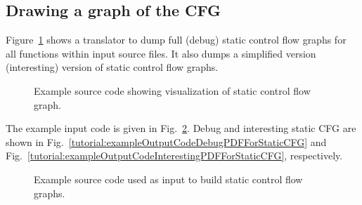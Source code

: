 \subsection{Drawing a graph of the CFG}
Figure~\ref{Tutorial:BuildStaticCFG} shows a translator to dump 
full (debug) static control flow graphs for all functions within input
source files. It also dumps a simplified version (interesting) version of 
static control flow graphs. 

\begin{figure}[!h]
{\indent
  {\mySmallFontSize
    \begin{latexonly}
    
    \end{latexonly}

    \begin{htmlonly}
    
    \end{htmlonly}

  }
}
\label{Tutorial:BuildStaticCFG}
\caption{Example source code showing visualization of static control flow graph.}
\end{figure}

The example input code is given in
Fig.~\ref{Tutorial:exampleInputCode_staticCFG}. Debug and interesting static CFG 
are shown in Fig.~\ref{tutorial:exampleOutputCodeDebugPDFForStaticCFG} and
Fig.~\ref{tutorial:exampleOutputCodeInterestingPDFForStaticCFG}, respectively.

\begin{figure}[!h]
{\indent
  {\mySmallFontSize


    \begin{latexonly}
    
    \end{latexonly}

    \begin{htmlonly}
    
    \end{htmlonly}

  }
}
\label{Tutorial:exampleInputCode_staticCFG}
\caption{Example source code used as input to build static control flow graphs.}
\end{figure}

